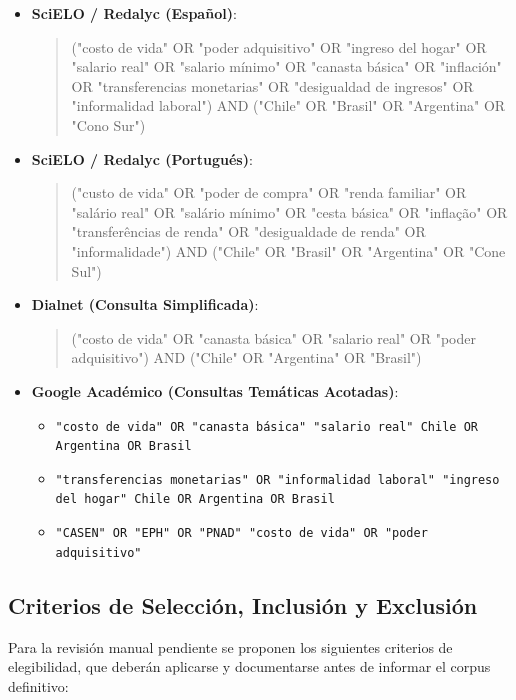 \begin{itemize}
    \item \textbf{SciELO / Redalyc (Español)}:
    \begin{quote}
    \small\ttfamily\raggedright
    ("costo de vida" OR "poder adquisitivo" OR "ingreso del hogar" OR "salario real" OR "salario mínimo" OR "canasta básica" OR "inflación" OR "transferencias monetarias" OR "desigualdad de ingresos" OR "informalidad laboral") AND ("Chile" OR "Brasil" OR "Argentina" OR "Cono Sur")
    \end{quote}

    \item \textbf{SciELO / Redalyc (Portugués)}:
    \begin{quote}
    \small\ttfamily\raggedright
    ("custo de vida" OR "poder de compra" OR "renda familiar" OR "salário real" OR "salário mínimo" OR "cesta básica" OR "inflação" OR "transferências de renda" OR "desigualdade de renda" OR "informalidade") AND ("Chile" OR "Brasil" OR "Argentina" OR "Cone Sul")
    \end{quote}

    \item \textbf{Dialnet (Consulta Simplificada)}:
    \begin{quote}
    \small\ttfamily\raggedright
    ("costo de vida" OR "canasta básica" OR "salario real" OR "poder adquisitivo") AND ("Chile" OR "Argentina" OR "Brasil")
    \end{quote}

    \item \textbf{Google Académico (Consultas Temáticas Acotadas)}:
    \begin{itemize}
        \item \texttt{"costo de vida" OR "canasta básica" "salario real" Chile OR Argentina OR Brasil}
        \item \texttt{"transferencias monetarias" OR "informalidad laboral" "ingreso del hogar" Chile OR Argentina OR Brasil}
        \item \texttt{"CASEN" OR "EPH" OR "PNAD" "costo de vida" OR "poder adquisitivo"}
    \end{itemize}
\end{itemize}

\subsection{Criterios de Selección, Inclusión y Exclusión}
Para la revisión manual pendiente se proponen los siguientes criterios de elegibilidad, que deberán aplicarse y documentarse antes de informar el corpus definitivo:

